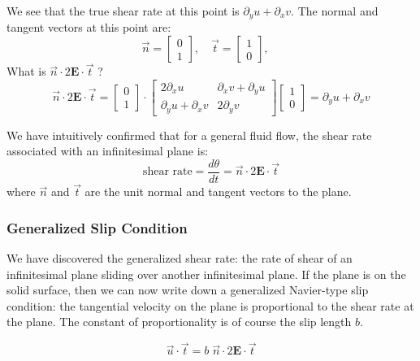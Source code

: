 \documentclass[a4paper]{report}
\begin{document}
We see that the true shear rate at this point is $\partial_y u + \partial_x v$. The normal and tangent vectors at this point are:
\begin{equation}
\vec{n} = 
\begin{bmatrix}
0 \\ 1
\end{bmatrix}
, \quad
\vec{t} =
\begin{bmatrix}
1 \\ 0
\end{bmatrix}
, \quad
\end{equation}
 What is $\vec{n} \cdot 2 \mathbf{E} \cdot \vec{t}$ ?
\begin{equation}
\vec{n} \cdot 2 \mathbf{E} \cdot \vec{t} = 
\begin{bmatrix}
0 \\ 1
\end{bmatrix}
\cdot
\begin{bmatrix}
2 \partial_x u   & \partial_x v + \partial_y u  \\
\partial_y u + \partial_x v  &  2 \partial_y v
\end{bmatrix}
\begin{bmatrix}
1 \\ 0
\end{bmatrix}
=
\partial_y u + \partial_x v
\end{equation}


We have intuitively confirmed that for a general fluid flow, the shear rate associated with an infinitesimal plane is:
\begin{equation}
\text{shear rate} = \frac{d\theta}{dt} = \vec{n} \cdot 2 \mathbf{E} \cdot \vec{t}
\end{equation}
where $\vec{n}$ and $\vec{t}$ are the unit normal and tangent vectors to the plane.

\subsubsection*{Generalized Slip Condition}

We have discovered the generalized shear rate: the rate of shear of an infinitesimal plane sliding over another infinitesimal plane.  If the plane is on the solid surface, then we can now write down a generalized Navier-type slip condition: the tangential velocity on the plane is proportional to the shear rate at the plane.  The constant of proportionality is of course the slip length $b$.

\begin{equation}
\vec{u} \cdot \vec{t} = b \; \vec{n} \cdot 2 \mathbf{E} \cdot \vec{t}
\end{equation}
\end{document}
